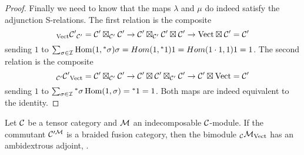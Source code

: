 \documentclass{amsart}
\begin{document}
\begin{proof}
Finally we need to know that the maps $\lambda$ and $\mu$ do indeed satisfy the adjunction S-relations.  The first relation is the composite
$${}_{\mathrm{Vect}} {\mathcal C'}_{\mathcal C'} = \mathcal C' \boxtimes_{\mathcal C'} \mathcal C' \rightarrow \mathcal C' \boxtimes_{\mathcal C'} \mathcal C' \boxtimes \mathcal C' \rightarrow \mathrm{Vect} \boxtimes \mathcal C' = \mathcal C'$$
sending $1$ to $\sum_{\sigma \in \mathcal I} \operatorname{Hom}(1,{}^*{\sigma}) \sigma = Hom(1, {}^*{1}) 1 = Hom(1 \cdot 1, 1) 1 = 1$.
The second relation is the composite
$${}_{\mathcal C'} {\mathcal C'}_{\mathrm{Vect}} = \mathcal C' \boxtimes_{\mathcal C'} \mathcal C' \rightarrow \mathcal C' \boxtimes \mathcal C' \boxtimes_{\mathcal C'} \mathcal C' \rightarrow \mathcal C' \boxtimes \mathrm{Vect} = \mathcal C'$$
sending $1$ to $\sum_{\sigma \in \mathcal I} {}^*{\sigma} \operatorname{Hom}(1,\sigma) = {}^*{1} = 1$.  Both maps are indeed equivalent to the identity.


\end{proof}


\begin{theorem} \label{thm-indecompbraided}
Let $\mathcal C$ be a tensor category and $\mathcal M$ an indecomposable $\mathcal C$-module.  If the commutant $\mathcal C'^{\mathcal M}$ is a braided fusion category, then the bimodule ${}_{\mathcal C} {\mathcal M}_{\mathrm{Vect}}$ has an ambidextrous adjoint, .
\end{theorem}
\end{document}

